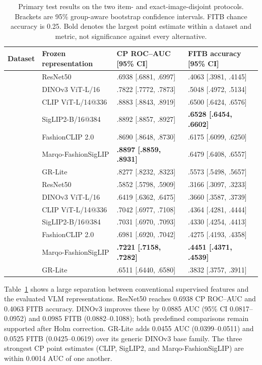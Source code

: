 \documentclass[pdflatex,sn-mathphys-num,iicol]{sn-jnl}
\begin{document}
\begin{table}[t]
\caption{Primary test results on the two item- and exact-image-disjoint protocols. Brackets are 95\% group-aware bootstrap confidence intervals. FITB chance accuracy is 0.25. Bold denotes the largest point estimate within a dataset and metric, not significance against every alternative.}
\label{tab:main}
\centering\small\setlength{\tabcolsep}{5pt}\renewcommand{\arraystretch}{1.05}
\begin{tabularx}{\textwidth}{@{}>{\raggedright\arraybackslash}p{}>{\raggedright\arraybackslash}p{}>{\centering\arraybackslash}X>{\centering\arraybackslash}X@{}}
\toprule
Dataset & Frozen representation & CP ROC--AUC [95\% CI] & FITB accuracy [95\% CI] \\
\midrule
\multirow{7}{*}{Polyvore-D-Clean}
 & ResNet50 & .6938 [.6881, .6997] & .4063 [.3981, .4145] \\
 & DINOv3 ViT-L/16 & .7822 [.7772, .7873] & .5048 [.4972, .5134] \\
 & CLIP ViT-L/14@336 & .8883 [.8843, .8919] & .6500 [.6424, .6576] \\
 & SigLIP2-B/16@384 & .8892 [.8857, .8927] & \textbf{.6528 [.6454, .6602]} \\
 & FashionCLIP 2.0 & .8690 [.8648, .8730] & .6175 [.6099, .6250] \\
 & Marqo-FashionSigLIP & \textbf{.8897 [.8859, .8931]} & .6479 [.6408, .6557] \\
 & GR-Lite & .8277 [.8232, .8323] & .5573 [.5498, .5657] \\
\midrule
\multirow{7}{*}{IQON3000-Clean}
 & ResNet50 & .5852 [.5798, .5909] & .3166 [.3097, .3233] \\
 & DINOv3 ViT-L/16 & .6419 [.6362, .6475] & .3660 [.3587, .3739] \\
 & CLIP ViT-L/14@336 & .7042 [.6977, .7108] & .4364 [.4281, .4444] \\
 & SigLIP2-B/16@384 & .7031 [.6970, .7093] & .4330 [.4254, .4413] \\
 & FashionCLIP 2.0 & .6981 [.6920, .7042] & .4275 [.4193, .4358] \\
 & Marqo-FashionSigLIP & \textbf{.7221 [.7158, .7282]} & \textbf{.4451 [.4371, .4539]} \\
 & GR-Lite & .6511 [.6440, .6580] & .3832 [.3757, .3911] \\
\bottomrule
\end{tabularx}
\end{table}

Table~\ref{tab:main} shows a large separation between conventional supervised features and the evaluated VLM representations. ResNet50 reaches 0.6938 CP ROC--AUC and 0.4063 FITB accuracy. DINOv3 improves these by 0.0885 AUC (95\% CI 0.0817--0.0952) and 0.0985 FITB (0.0882--0.1088); both predefined comparisons remain supported after Holm correction. GR-Lite adds 0.0455 AUC (0.0399--0.0511) and 0.0525 FITB (0.0425--0.0619) over its generic DINOv3 base family. The three strongest CP point estimates (CLIP, SigLIP2, and Marqo-FashionSigLIP) are within 0.0014 AUC of one another.
\end{document}
